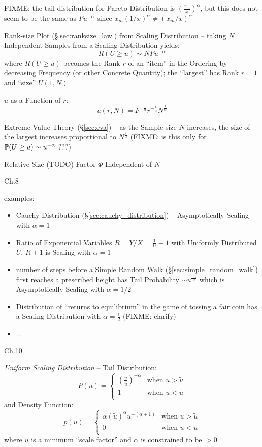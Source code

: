 FIXME: the tail distribution for Pareto Distribution is
$(\frac{x_m}{x})^\alpha$, but this does not seem to be the same as
$Fu^{-\alpha}$ since $x_m (1/x)^\alpha \neq (x_m/x)^\alpha$

Rank-size Plot (\S\ref{sec:ranksize_law}) from Scaling Distribution -- taking
$N$ Independent Samples from a Scaling Distribution yields:
\[
  R(U \geq u) \sim N F u^{-\alpha}
\]
where $R(U \geq u)$ becomes the Rank $r$ of an ``item'' in the Ordering by
decreasing Frequency (or other Concrete Quantity); the ``largest'' has Rank
$r=1$ and ``size'' $U(1, N)$

$u$ as a Function of $r$:
\[
  u(r, N) = F^{-\frac{1}{\alpha}} r^{-\frac{1}{\alpha}} N^\frac{1}{\alpha}
\]

Extreme Value Theory (\S\ref{sec:eva}) -- as the Sample size $N$ increases, the
size of the largest increases proportional to $N^{\frac{1}{\alpha}}$
(FIXME: is this only for $\mathbb{P}(U \geq u) \sim u^{-\alpha}$ ???)

Relative Size (TODO) Factor $\Phi$ Independent of $N$

Ch.8

examples:

\begin{itemize}
  \item Cauchy Distribution (\S\ref{sec:cauchy_distribution}) -- Asymptotically
    Scaling with $\alpha = 1$
  \item Ratio of Exponential Variables $R = Y/X = \frac{1}{U} - 1$ with
    Uniformly Distributed $U$, $R+1$ is Scaling with $\alpha = 1$
  \item number of steps before a Simple Random Walk
    (\S\ref{sec:simple_random_walk}) first reaches a prescribed height has Tail
    Probability $\sim u^\frac{-1}{2}$ which is Asymptotically Scaling with
    $\alpha = 1/2$
  \item Distribution of ``returns to equilibrium'' in the game of tossing a fair
    coin has a Scaling Distribution with $\alpha = \frac{1}{2}$ (FIXME: clarify)
  \item ...
\end{itemize}

Ch.10

\emph{Uniform Scaling Distribution} -- Tail Distribution:
\[
  P(u) = \begin{cases}
    (\frac{u}{\tilde{u}})^{-\alpha} & \text{when } u > \tilde{u} \\
    1                               & \text{when } u < \tilde{u} \\
  \end{cases}
\]
and Density Function:
\[
  p(u) = \begin{cases}
    \alpha(\tilde{u})^\alpha u^{-(\alpha+1)} & \text{when } u > \tilde{u} \\
    0                                        & \text{when } u < \tilde{u} \\
  \end{cases}
\]
where $\tilde{u}$ is a minimum ``scale factor'' and $\alpha$ is constrained to
be $> 0$

